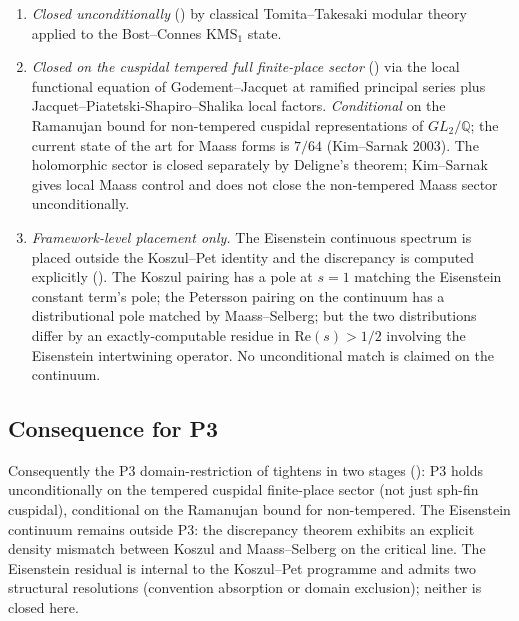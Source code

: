\begin{enumerate}
\item[(I)] \emph{Closed unconditionally}
() by classical
Tomita--Takesaki modular theory applied to the Bost--Connes KMS\({}_{1}\)
state.
\item[(II)] \emph{Closed on the cuspidal tempered full finite-place
sector} ()
via the local functional equation of Godement--Jacquet at ramified
principal series plus Jacquet--Piatetski-Shapiro--Shalika local
factors. \emph{Conditional} on the Ramanujan bound for non-tempered
cuspidal representations of \(GL_{2}/\mathbb{Q}\); the current
state of the art for Maass forms is \(7/64\) (Kim--Sarnak 2003).
The holomorphic sector is closed separately by Deligne's theorem;
Kim--Sarnak gives local Maass control and does not close the
non-tempered Maass sector unconditionally.
\item[(III)] \emph{Framework-level placement only.} The Eisenstein
continuous spectrum is placed outside the Koszul--Pet identity and
the discrepancy is computed explicitly
(). The Koszul pairing
has a pole at \(s=1\) matching the Eisenstein constant term's pole;
the Petersson pairing on the continuum has a distributional pole
matched by Maass--Selberg; but the two distributions differ by an
exactly-computable residue in \(\mathrm{Re}(s)>1/2\) involving the
Eisenstein intertwining operator. No unconditional match is claimed
on the continuum.
\end{enumerate}

\subsection{Consequence for P3}
\label{v4-arith:kms-gns:P3-consequence}

Consequently the P3 domain-restriction of
 tightens in two stages
(): P3 holds
unconditionally on the tempered cuspidal finite-place sector
(not just sph-fin cuspidal), conditional on the Ramanujan bound for
non-tempered. The Eisenstein continuum remains outside P3: the
discrepancy theorem 
exhibits an explicit density mismatch between Koszul and
Maass--Selberg on the critical line. The Eisenstein residual is
internal to the Koszul--Pet programme and admits two structural
resolutions (convention absorption or domain exclusion); neither is
closed here.


